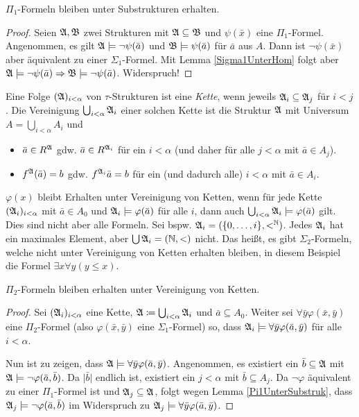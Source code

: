\begin{lemma}
	$\Pi_1$-Formeln bleiben unter Substrukturen erhalten.
	\label{Pi1UnterSubstruk}
\end{lemma}
\begin{proof}
	Seien $\mathfrak{A},\mathfrak{B}$ zwei Strukturen mit $\mathfrak{A}\subseteq\mathfrak{B}$ und $\psi(\bar{x})$ eine $\Pi_1$-Formel. Angenommen, es gilt $\mathfrak{A}\models\neg\psi(\bar{a})$ und $\mathfrak{B}\models\psi(\bar{a})$ für $\bar{a}$ aus $A$. Dann ist $\neg\psi(\bar{x})$ aber äquivalent zu einer $\Sigma_1$-Formel. Mit Lemma \ref{Sigma1UnterHom} folgt aber $\mathfrak{A}\models\neg\psi(\bar{a})\Rightarrow\mathfrak{B}\models\neg\psi(\bar{a})$. Widerspruch!
\end{proof}

\begin{definition}
	Eine Folge $(\mathfrak{A})_{i<\alpha}$ von $\tau$-Strukturen ist eine \textit{Kette}, wenn jeweils $\mathfrak{A}_i\subseteq\mathfrak{A}_j$ für $i<j$. Die Vereinigung $\bigcup_{i<\alpha}\mathfrak{A}_i$ einer solchen Kette ist die Struktur $\mathfrak{A}$ mit Universum $A=\bigcup_{i<\alpha}A_i$ und
	\begin{itemize}
		\item $\bar{a}\in R^{\mathfrak{A}}$ gdw. $\bar{a}\in R^{\mathfrak{A}_i}$ für ein $i<\alpha$ (und daher für alle $j<\alpha$ mit $\bar{a}\in A_j$).
		\item $f^{\mathfrak{A}}(\bar{a})=b$ gdw. $f^{\mathfrak{A}_i}\bar{a}=b$ für ein (und dadurch alle) $i<\alpha$ mit $\bar{a}\in A_i$.
	\end{itemize}
\end{definition}
$\varphi(x)$ bleibt Erhalten unter Vereinigung von Ketten, wenn für jede Kette $(\mathfrak{A}_i)_{i<\alpha}$ mit $\bar{a}\in A_0$ und $\mathfrak{A}_i\models\varphi(\bar{a})$ für alle $i$, dann auch $\bigcup_{i<\alpha}\mathfrak{A}_i \models \varphi(\bar{a})$ gilt.
\\
Dies sind nicht aber alle Formeln. Sei bspw. $\mathfrak{A}_i=(\{0,\dots,i\},<^{\mathbb{N}})$. Jedes $\mathfrak{A}_i$ hat ein maximales Element, aber $\bigcup\mathfrak{A}_i=(\mathbb{N},<)$ nicht. Das heißt, es gibt $\Sigma_2$-Formeln, welche nicht unter Vereinigung von Ketten erhalten bleiben, in diesem Beispiel die Formel $\exists x \forall y (y\leq x)$.

\begin{lemma}
	$\Pi_2$-Formeln bleiben erhalten unter Vereinigung von Ketten.
\end{lemma}
\begin{proof}
	Sei $(\mathfrak{A}_i)_{i<\alpha}$ eine Kette, $\mathfrak{A}\coloneqq\bigcup_{i<\alpha}\mathfrak{A}_i$ und $\bar{a}\subseteq A_0$. Weiter sei $\forall \bar{y} \varphi(\bar{x},\bar{y})$ eine $\Pi_2$-Formel (also $\varphi(\bar{x},\bar{y})$ eine $\Sigma_1$-Formel) so, dass $\mathfrak{A}_i\models\forall \bar{y} \varphi(\bar{a},\bar{y})$ für alle $i<\alpha$.
	
	Nun ist zu zeigen, dass $\mathfrak{A}\models\forall \bar{y} \varphi(\bar{a},\bar{y})$. Angenommen, es existiert ein $\bar{b}\subseteq\mathfrak{A}$ mit $\mathfrak{A}\models\neg\varphi(\bar{a},\bar{b})$. Da $\vert\bar{b}\vert$ endlich ist, existiert ein $j<\alpha$ mit $\bar{b}\subseteq A_j$. 
	Da $\neg\varphi$ äquivalent zu einer $\Pi_1$-Formel ist und $\mathfrak{A}_j\subseteq\mathfrak{A}$, folgt wegen Lemma \ref{Pi1UnterSubstruk}, dass $\mathfrak{A}_j\models\neg\varphi(\bar{a},\bar{b})$ im Widerspruch zu $\mathfrak{A}_j\models\forall\bar{y}\varphi(\bar{a},\bar{y})$.
\end{proof}

